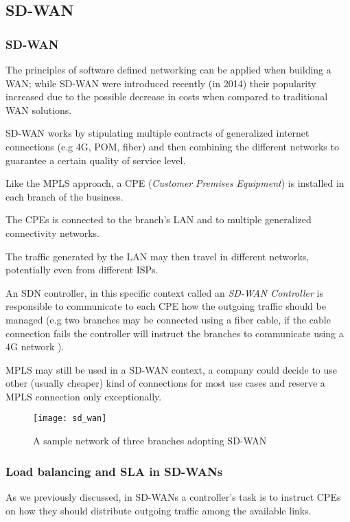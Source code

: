 \subsection{SD-WAN}

\subsubsection{SD-WAN}
The principles of software defined networking can be applied when building a WAN;
while SD-WAN were introduced recently (in 2014) their popularity increased due to the possible decrease in costs when compared to traditional WAN solutions.

SD-WAN works by stipulating multiple contracts of generalized internet connections (e.g 4G, POM, fiber) and then combining the different networks to guarantee a certain quality of service level.

Like the MPLS approach, a CPE (\textit{Customer} \textit{Premises} \textit{Equipment}) is installed in each branch of the business.

The CPEs is connected to the branch's LAN and to multiple generalized connectivity networks.

The traffic generated by the LAN may then travel in different networks, potentially even from different ISPs.

An SDN controller, in this specific context called an \textit{SD-WAN Controller} is responsible to communicate to each CPE how the outgoing traffic should be managed (e.g two branches may be connected using a fiber cable, if the cable connection fails the controller will instruct the branches to communicate using a 4G network ).

MPLS may still be used in a SD-WAN context, a company could decide to use other (usually cheaper) kind of connections for most use cases and reserve a MPLS connection only exceptionally.

\pagebreak

\begin{figure}[t]
\texttt{[image: sd\_wan]}
\caption{A sample network of three branches adopting SD-WAN}

\centering
\end{figure}


\subsubsection{Load balancing and SLA in SD-WANs}

As we previously discussed, in SD-WANs a controller's task is to instruct CPEs on how they should distribute outgoing traffic among the available links. \\

